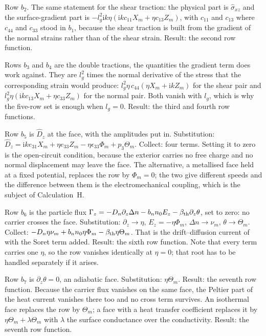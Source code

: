 \documentclass[11pt]{article}
\makeatletter
\newif\ifshowworked
\newenvironment{worked}{%
  \ifshowworked\par\smallskip\noindent\textit{Working.}\par\smallskip\else
  \setbox\z@\vbox\bgroup\fi}{\ifshowworked\par\smallskip\else\egroup\fi}
\newcommand{\ii}{\mathrm{i}}
\makeatother
\begin{document}
\begin{worked}
Row $b_2$. The same statement for the shear traction: the physical part is $\hat\sigma_{xz}$ and the
surface-gradient part is $-l_g^2\ii k\eta(\ii kc_{11}X_m+\eta c_{13}Z_m)$, with $c_{11}$ and $c_{13}$
where $c_{44}$ and $c_{33}$ stood in $b_1$, because the shear traction is built from the gradient of the
normal strains rather than of the shear strain. Result: the second row function.
\end{worked}

\begin{worked}
Rows $b_3$ and $b_4$ are the double tractions, the quantities the gradient term does work against. They
are $l_g^2$ times the normal derivative of the stress that the corresponding strain would produce:
$l_g^2\eta\,c_{44}(\eta X_m+\ii kZ_m)$ for the shear pair and $l_g^2\eta(\ii kc_{13}X_m+\eta c_{33}Z_m)$
for the normal pair. Both vanish with $l_g$, which is why the five-row set is enough when $l_g=0$.
Result: the third and fourth row functions.
\end{worked}

\begin{worked}
Row $b_5$ is $\hat D_z$ at the face, with the amplitudes put in. Substitution:
$\hat D_z=\ii ke_{31}X_m+\eta e_{33}Z_m-\eta\epsilon_{33}\Phi_m+p_3\Theta_m$. Collect: four terms. Setting
it to zero is the open-circuit condition, because the exterior carries no free charge and no normal
displacement may leave the face. The alternative, a metallised face held at a fixed potential, replaces
the row by $\Phi_m=0$; the two give different speeds and the difference between them is the
electromechanical coupling, which is the subject of Calculation~H.
\end{worked}

\begin{worked}
Row $b_6$ is the particle flux
$\Gamma_z=-D_n\partial_z\Delta n-b_nn_0E_z-\beta_{\rm th}\partial_z\theta$, set to zero: no carrier
crosses the face. Substitution: $\partial_z\to\eta$, $E_z=-\eta\Phi_m$, $\Delta n\to\nu_m$,
$\theta\to\Theta_m$. Collect: $-D_n\eta\nu_m+b_nn_0\eta\Phi_m-\beta_{\rm th}\eta\Theta_m$. That is the
drift--diffusion current of \cite[Eqs.~(3), (7)]{YangZhou2005} with the Soret term added. Result: the
sixth row function. Note that every term carries one $\eta$, so the row vanishes identically at
$\eta=0$; that root has to be handled separately if it arises.
\end{worked}

\begin{worked}
Row $b_7$ is $\partial_z\theta=0$, an adiabatic face. Substitution: $\eta\Theta_m$. Result: the seventh
row function. Because the carrier flux vanishes on the same face, the Peltier part of the heat current
vanishes there too and no cross term survives. An isothermal face replaces the row by $\Theta_m$; a
face with a heat transfer coefficient replaces it by $\eta\Theta_m+\lambda\Theta_m$ with $\lambda$ the
surface conductance over the conductivity. Result: the seventh row function.
\end{worked}
\end{document}
